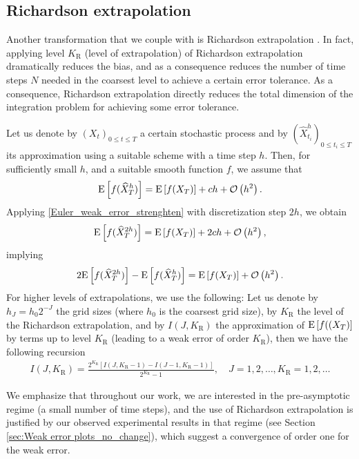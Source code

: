 \subsection{Richardson extrapolation}\label{sec:Richardson extrapolation}
Another transformation that we couple with  is Richardson extrapolation \cite{talay1990expansion}. In fact, applying level $K_\text{R}$ (level of extrapolation) of Richardson extrapolation  dramatically reduces the bias, and as a consequence reduces the  number of time steps $N$ needed in the coarsest level to achieve a certain error tolerance. As a consequence, Richardson extrapolation directly reduces  the total dimension of the integration problem for achieving some error tolerance.

Let us denote by $(X_t)_{0 \le t \le T}$ a certain stochastic process and by $(\hat{X}_{t_i}^h)_{0 \le  t_i \le T}$ its approximation using a suitable  scheme with a time step $h$.  Then, for sufficiently small $h$, and a suitable smooth function $f$, we assume that
\begin{align}\label{Euler_weak_error_strenghten}
	\mathrm{E}\left[f(\widehat{X}_T^h)\right]= \mathrm{E}\left[f(X_T)\right] + c h +{\mathcal{O}}\left(h^2\right) .
\end{align}
Applying \eqref{Euler_weak_error_strenghten} with discretization step $2h$, we  obtain
\begin{align*}
	\mathrm{E}\left[f(\widehat{X}_T^{2h})\right]= \mathrm{E}\left[f(X_T)\right] + 2 c h +{\mathcal{O}}\left(h^2\right) ,
\end{align*}
implying
\begin{align*}
	2 \mathrm{E}\left[f(\widehat{X}_T^{2h})\right]- \mathrm{E}\left[f(\widehat{X}_T^{h})\right] =\mathrm{E}\left[f(X_T)\right] + {\mathcal{O}}\left(h^2\right) .
\end{align*}
For higher levels of extrapolations, we use the following: Let us denote by $h_J=h_0 2^{-J}$ the grid sizes (where $h_0$ is the coarsest grid size), by $K_\text{R}$ the level of the Richardson extrapolation, and by $I(J,K_\text{R})$ the approximation of $\mathrm{E}\left[f((X_T)\right]$ by terms up to level $K_\text{R}$ (leading to a weak error of order $K_\text{R}$), then we have the following recursion 
\begin{align*}
I(J,K_\text{R})=\frac{2^{K_\text{R}}\left[I(J,K_\text{R}-1)-I(J-1,K_\text{R}-1)\right]}{2^{K_\text{R}}-1},\quad J=1,2,\dots, K_\text{R}=1,2,\dots
\end{align*}
\begin{remark}
We emphasize that throughout our work, we are interested in the pre-asymptotic regime (a small number of time steps), and the use of Richardson extrapolation is justified by our observed experimental results in that regime (see Section \ref{sec:Weak error plots_no_change}),  which suggest  a convergence of order one for the weak error. 
\end{remark}

%
